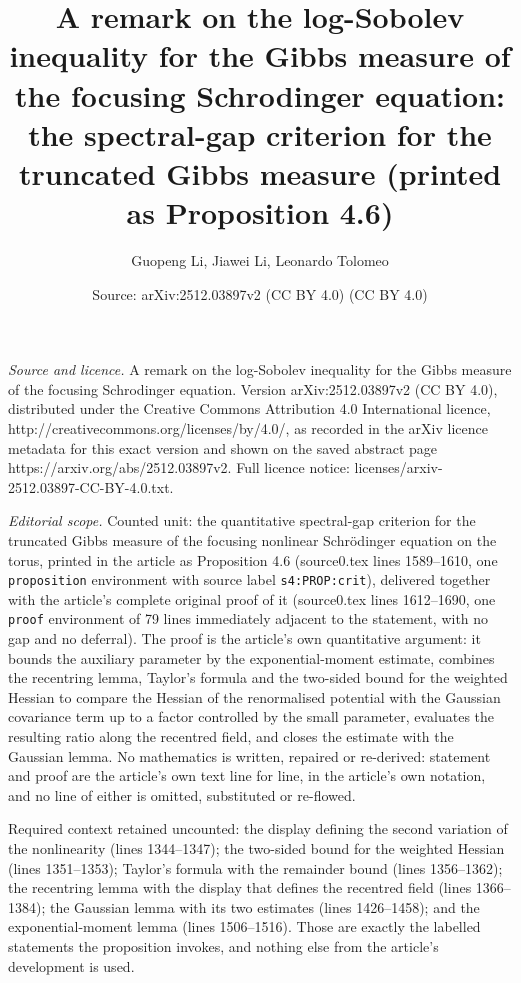 \documentclass[10pt,a4paper]{amsart}
\title[A remark on the log-Sobolev inequality for the Gibbs measure of the focusing Schrodinger equation]{A remark on the log-Sobolev inequality for the Gibbs measure of the focusing Schrodinger equation: the spectral-gap criterion for the truncated Gibbs measure (printed as Proposition 4.6)}
\author{Guopeng Li, Jiawei Li, Leonardo Tolomeo}
\date{Source: arXiv:2512.03897v2 (CC BY 4.0) (CC BY 4.0)}
\theoremstyle{plain}
\theoremstyle{definition}
\theoremstyle{remark}
\begin{document}
\maketitle

\noindent\emph{Source and licence.} A remark on the log-Sobolev inequality for the Gibbs measure of the focusing Schrodinger equation. Version arXiv:2512.03897v2 (CC BY 4.0), distributed under the Creative Commons Attribution 4.0 International licence, http://creativecommons.org/licenses/by/4.0/, as recorded in the arXiv licence metadata for this exact version and shown on the saved abstract page https://arxiv.org/abs/2512.03897v2. Full licence notice: licenses/arxiv-2512.03897-CC-BY-4.0.txt.\par\smallskip

\noindent\textit{Editorial scope.} Counted unit: the quantitative spectral-gap criterion for the truncated Gibbs measure of the focusing nonlinear Schr\"odinger equation on the torus, printed in the article as Proposition 4.6 (source0.tex lines 1589--1610, one \texttt{proposition} environment with source label \texttt{s4:PROP:crit}), delivered together with the article's complete original proof of it (source0.tex lines 1612--1690, one \texttt{proof} environment of 79 lines immediately adjacent to the statement, with no gap and no deferral). The proof is the article's own quantitative argument: it bounds the auxiliary parameter by the exponential-moment estimate, combines the recentring lemma, Taylor's formula and the two-sided bound for the weighted Hessian to compare the Hessian of the renormalised potential with the Gaussian covariance term up to a factor controlled by the small parameter, evaluates the resulting ratio along the recentred field, and closes the estimate with the Gaussian lemma. No mathematics is written, repaired or re-derived: statement and proof are the article's own text line for line, in the article's own notation, and no line of either is omitted, substituted or re-flowed.

Required context retained uncounted: the display defining the second variation of the nonlinearity (lines 1344--1347); the two-sided bound for the weighted Hessian (lines 1351--1353); Taylor's formula with the remainder bound (lines 1356--1362); the recentring lemma with the display that defines the recentred field (lines 1366--1384); the Gaussian lemma with its two estimates (lines 1426--1458); and the exponential-moment lemma (lines 1506--1516). Those are exactly the labelled statements the proposition invokes, and nothing else from the article's development is used.
\end{document}
